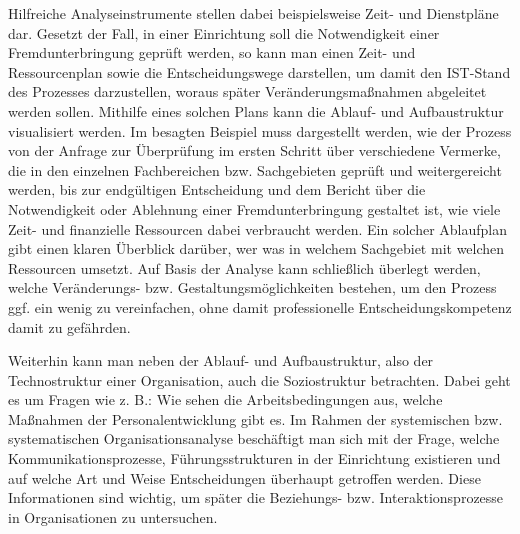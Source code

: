 \documentclass[
  letterpaper,
]{book}
\begin{document}
Hilfreiche Analyseinstrumente stellen dabei beispielsweise Zeit- und
Dienstpläne dar. Gesetzt der Fall, in einer Einrichtung soll die
Notwendigkeit einer Fremdunterbringung geprüft werden, so kann man einen
Zeit- und Ressourcenplan sowie die Entscheidungswege darstellen, um
damit den IST-Stand des Prozesses darzustellen, woraus später
Veränderungsmaßnahmen abgeleitet werden sollen. Mithilfe eines solchen
Plans kann die Ablauf- und Aufbaustruktur visualisiert werden. Im
besagten Beispiel muss dargestellt werden, wie der Prozess von der
Anfrage zur Überprüfung im ersten Schritt über verschiedene Vermerke,
die in den einzelnen Fachbereichen bzw. Sachgebieten geprüft und
weitergereicht werden, bis zur endgültigen Entscheidung und dem Bericht
über die Notwendigkeit oder Ablehnung einer Fremdunterbringung gestaltet
ist, wie viele Zeit- und finanzielle Ressourcen dabei verbraucht werden.
Ein solcher Ablaufplan gibt einen klaren Überblick darüber, wer was in
welchem Sachgebiet mit welchen Ressourcen umsetzt. Auf Basis der Analyse
kann schließlich überlegt werden, welche Veränderungs- bzw.
Gestaltungsmöglichkeiten bestehen, um den Prozess ggf. ein wenig zu
vereinfachen, ohne damit professionelle Entscheidungskompetenz damit zu
gefährden.

Weiterhin kann man neben der Ablauf- und Aufbaustruktur, also der
Technostruktur einer Organisation, auch die Soziostruktur betrachten.
Dabei geht es um Fragen wie z. B.: Wie sehen die Arbeitsbedingungen aus,
welche Maßnahmen der Personalentwicklung gibt es. Im Rahmen der
systemischen bzw. systematischen Organisationsanalyse beschäftigt man
sich mit der Frage, welche Kommunikationsprozesse, Führungsstrukturen in
der Einrichtung existieren und auf welche Art und Weise Entscheidungen
überhaupt getroffen werden. Diese Informationen sind wichtig, um später
die Beziehungs- bzw. Interaktionsprozesse in Organisationen zu
untersuchen.
\end{document}
